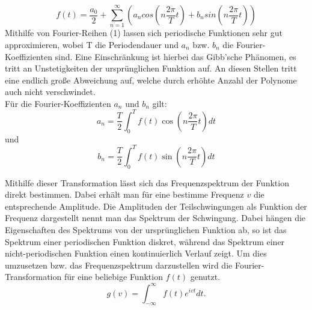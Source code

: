 \begin{equation} 
f(t) = \frac{a_0}{2} + \sum_{n=1}^\infty (a_n cos(n\frac{2\pi}{T}t) + b_n sin(n\frac{2\pi}{T}t)) 
\end{equation}
Mithilfe von Fourier-Reihen (1) lassen sich periodische Funktionen sehr gut approximieren, wobei T die Periodendauer und $a_n$ bzw. $b_n$ die Fourier-Koeffizienten sind. Eine Einschränkung ist hierbei das Gibb'sche Phänomen, es tritt an Unstetigkeiten der ursprünglichen Funktion auf. An diesen Stellen tritt eine endlich große Abweichung auf, welche durch erhöhte Anzahl der Polynome auch nicht verschwindet. \\
Für die Fourier-Koeffizienten $a_n$ und $b_n$ gilt:
\begin{equation}
a_n = \frac{T}{2}\int_{0}^{T} f(t) \cos(n\frac{2\pi}{T}t) dt
\end{equation}
und
\begin{equation}
b_n = \frac{T}{2}\int_{0}^{T} f(t) \sin(n\frac{2\pi}{T}t) dt
\end{equation}

Mithilfe dieser Transformation lässt sich das Frequenzspektrum der Funktion direkt bestimmen. 
Dabei erhält man für eine bestimme Frequenz $v$ die entsprechende Amplitude.
Die Amplituden der Teilschwingungen als Funktion der Frequenz dargestellt
nennt man das Spektrum der Schwingung. Dabei hängen die Eigenschaften des Spektrums von der
ursprünglichen Funktion ab, so ist das Spektrum einer periodischen Funktion diskret, während
das Spektrum einer nicht-periodischen Funktion einen kontinuierlich Verlauf zeigt. 
Um dies umzusetzen bzw. das Frequenzspektrum darzustellen wird die Fourier-Transformation für eine beliebige 
Funktion $f(t)$ genutzt.
\begin{equation}
g(v) = \int_{-\infty}^{\infty} f(t) e^{ivt} dt.
\end{equation}
